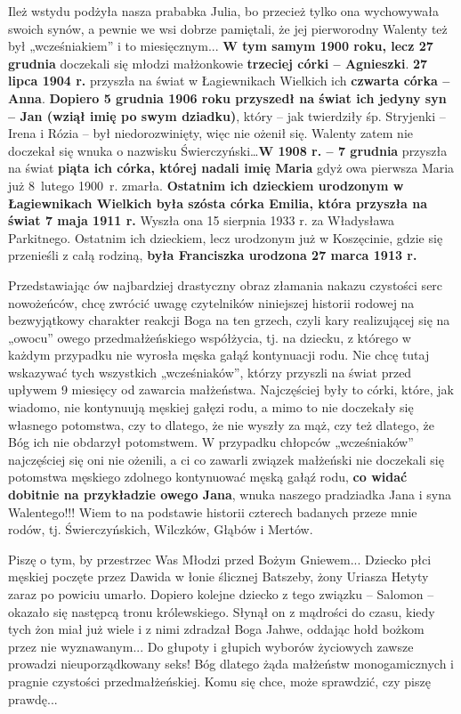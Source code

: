 Ileż wstydu podżyła nasza prababka Julia, bo przecież tylko ona wychowywała swoich synów, a pewnie we wsi dobrze pamiętali, że jej pierworodny Walenty też był „wcześniakiem” i to miesięcznym...\textbf{ W tym samym 1900 roku, lecz 27 grudnia} doczekali się młodzi małżonkowie \textbf{trzeciej córki – Agnieszki}. \textbf{27 lipca 1904 r.} przyszła na świat w Łagiewnikach Wielkich ich \textbf{czwarta córka – Anna}. \textbf{Dopiero 5 grudnia 1906 roku przyszedł na świat ich jedyny syn – Jan (wziął imię po swym dziadku)}, który – jak twierdziły śp. Stryjenki – Irena i Rózia – był niedorozwinięty, więc nie ożenił się. Walenty zatem nie doczekał się wnuka o nazwisku Świerczyński\ldots \textbf{W 1908 r. – 7 grudnia} przyszła na świat \textbf{piąta ich córka, której nadali imię Maria} gdyż owa pierwsza Maria już 8~lutego 1900~r. zmarła. \textbf{Ostatnim ich dzieckiem urodzonym w Łagiewnikach Wielkich była szósta córka Emilia, która przyszła na świat 7 maja 1911 r.} Wyszła ona 15 sierpnia 1933 r. za Władysława Parkitnego. Ostatnim ich dzieckiem, lecz urodzonym już w Koszęcinie, gdzie się przenieśli z całą rodziną, \textbf{była Franciszka urodzona 27 marca 1913 r.}

Przedstawiając ów najbardziej drastyczny obraz złamania nakazu czystości serc nowożeńców, chcę zwrócić uwagę czytelników niniejszej historii rodowej na bezwyjątkowy charakter reakcji Boga na ten grzech, czyli kary realizującej się na „owocu” owego przedmałżeńskiego współżycia, tj. na dziecku, z którego w każdym przypadku nie wyrosła męska gałąź kontynuacji rodu. Nie chcę tutaj wskazywać tych wszystkich „wcześniaków”, którzy przyszli na świat przed upływem 9 miesięcy od zawarcia małżeństwa. Najczęściej były to córki, które, jak wiadomo, nie kontynuują męskiej gałęzi rodu, a mimo to nie doczekały się własnego potomstwa, czy to dlatego, że nie wyszły za mąż, czy też dlatego, że Bóg ich nie obdarzył potomstwem. W przypadku chłopców „wcześniaków” najczęściej się oni nie ożenili, a ci co zawarli związek małżeński nie doczekali się potomstwa męskiego zdolnego kontynuować męską gałąź rodu, \textbf{co widać dobitnie na przykładzie owego Jana}, wnuka naszego pradziadka Jana i syna Walentego!!! Wiem to na podstawie historii czterech badanych przeze mnie rodów, tj. Świerczyńskich, Wilczków, Głąbów i Mertów.

Piszę o tym, by przestrzec Was Młodzi przed Bożym Gniewem... Dziecko płci męskiej poczęte przez Dawida w łonie ślicznej Batszeby, żony Uriasza Hetyty zaraz po powiciu umarło. Dopiero kolejne dziecko z tego związku – Salomon – okazało się następcą tronu królewskiego. Słynął on z mądrości do czasu, kiedy tych żon miał już wiele i z nimi zdradzał Boga Jahwe, oddając hołd bożkom przez nie wyznawanym... Do głupoty i głupich wyborów życiowych zawsze prowadzi nieuporządkowany seks! Bóg dlatego żąda małżeństw monogamicznych i pragnie czystości przedmałżeńskiej. Komu się chce, może sprawdzić, czy piszę prawdę...

